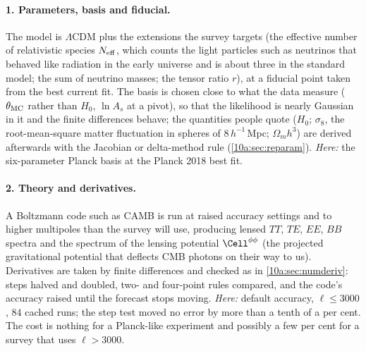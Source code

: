 \paragraph{1. Parameters, basis and fiducial.} The model is $\Lambda$CDM plus the extensions the survey targets (the
effective number of relativistic species $N_{\rm eff}$, which counts the light particles such as neutrinos that
behaved like radiation in the early universe and is about three in the standard model; the sum of neutrino masses;
the tensor ratio $r$), at a fiducial
point taken from the best current fit. The basis is chosen close to what the data measure ($\theta_{\rm MC}$ rather
than $H_0$, $\ln A_s$ at a pivot), so that the likelihood is nearly Gaussian in it and the finite differences behave;
the quantities people quote ($H_0$; $\sigma_8$, the root-mean-square matter fluctuation in spheres of $8\,h^{-1}$\,Mpc;
$\Omega_mh^3$) are derived afterwards with the Jacobian or delta-method rule
(\cref{10a:sec:reparam}). \emph{Here:} the six-parameter Planck basis at the Planck 2018 best fit.

\paragraph{2. Theory and derivatives.} A Boltzmann code such as CAMB is run at raised accuracy settings and to
higher multipoles than the survey will use, producing lensed $TT$, $TE$, $EE$, $BB$ spectra and the spectrum of the
lensing potential $\Cell^{\phi\phi}$ (the projected gravitational potential that deflects CMB photons on their way to us).
Derivatives are taken by finite differences and checked as in \cref{10a:sec:numderiv}:
steps halved and doubled, two- and four-point rules compared, and the code's accuracy raised until the forecast stops
moving. \emph{Here:} default accuracy, $\ell\le3000$, $84$ cached runs; the step test moved no error by more than a tenth of
a per cent. The cost is nothing for a Planck-like experiment and possibly a few per cent for a survey that uses
$\ell>3000$.

